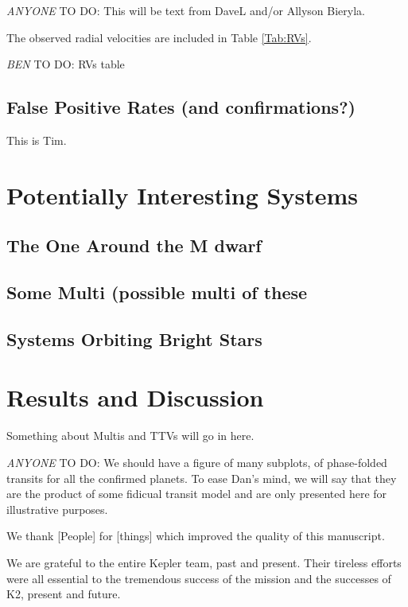 \documentclass{emulateapj}
\newcommand{\todo}[3]{{\color{#2} \emph{#1} TO DO: #3}}
\newcommand{\btmtodo}[1]{\todo{BEN}{red}{#1}}
\newcommand{\anytodo}[1]{\todo{ANYONE}{NavyBlue}{#1}}
\begin{document}
\anytodo{This will be text from DaveL and/or Allyson Bieryla.}

The observed radial velocities are included in Table \ref{Tab:RVs}.

\btmtodo{RVs table}




\subsection{False Positive Rates (and confirmations?)}
This is Tim.

\section{Potentially Interesting Systems}
\subsection{The One Around the M dwarf}



\subsection{Some Multi (possible multi of these}

\subsection{Systems Orbiting Bright Stars}

\section{Results and Discussion}

Something about Multis and TTVs will go in here.

\anytodo{We should have a figure of many subplots, of phase-folded
transits for all the confirmed planets. 
To ease Dan's mind, we will say that they are the product of 
some fidicual transit model and are only presented here for illustrative
purposes.}


\acknowledgements
We thank [People] for [things] which improved the quality of this manuscript.


We are grateful to the entire Kepler team, past and present. 
Their tireless efforts were all essential to the tremendous success of the mission and the successes of K2, present and future.
\end{document}
